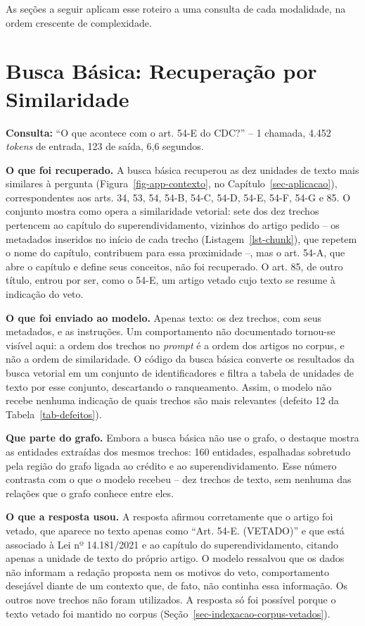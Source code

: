 As seções a seguir aplicam esse roteiro a uma consulta de cada modalidade, na ordem crescente de complexidade.

\section{Busca Básica: Recuperação por Similaridade}
\label{sec-analise-basic}

\textbf{Consulta:} ``O que acontece com o art. 54-E do CDC?'' -- 1 chamada, 4.452 \textit{tokens} de entrada, 123 de saída, 6,6 segundos.

\textbf{O que foi recuperado.} A busca básica recuperou as dez unidades de texto mais similares à pergunta (Figura~\ref{fig-app-contexto}, no Capítulo~\ref{sec-aplicacao}), correspondentes aos arts. 34, 53, 54, 54-B, 54-C, 54-D, 54-E, 54-F, 54-G e 85. O conjunto mostra como opera a similaridade vetorial: sete dos dez trechos pertencem ao capítulo do superendividamento, vizinhos do artigo pedido -- os metadados inseridos no início de cada trecho (Listagem~\ref{lst-chunk}), que repetem o nome do capítulo, contribuem para essa proximidade --, mas o art. 54-A, que abre o capítulo e define seus conceitos, não foi recuperado. O art. 85, de outro título, entrou por ser, como o 54-E, um artigo vetado cujo texto se resume à indicação do veto.

\textbf{O que foi enviado ao modelo.} Apenas texto: os dez trechos, com seus metadados, e as instruções. Um comportamento não documentado tornou-se visível aqui: a ordem dos trechos no \textit{prompt} é a ordem dos artigos no corpus, e não a ordem de similaridade. O código da busca básica converte os resultados da busca vetorial em um conjunto de identificadores e filtra a tabela de unidades de texto por esse conjunto, descartando o ranqueamento. Assim, o modelo não recebe nenhuma indicação de quais trechos são mais relevantes (defeito 12 da Tabela~\ref{tab-defeitos}).

\textbf{Que parte do grafo.} Embora a busca básica não use o grafo, o destaque mostra as entidades extraídas dos mesmos trechos: 160 entidades, espalhadas sobretudo pela região do grafo ligada ao crédito e ao superendividamento. Esse número contrasta com o que o modelo recebeu -- dez trechos de texto, sem nenhuma das relações que o grafo conhece entre eles.

\textbf{O que a resposta usou.} A resposta afirmou corretamente que o artigo foi vetado, que aparece no texto apenas como ``Art. 54-E. (VETADO)'' e que está associado à Lei nº 14.181/2021 e ao capítulo do superendividamento, citando apenas a unidade de texto do próprio artigo. O modelo ressalvou que os dados não informam a redação proposta nem os motivos do veto, comportamento desejável diante de um contexto que, de fato, não continha essa informação. Os outros nove trechos não foram utilizados. A resposta só foi possível porque o texto vetado foi mantido no corpus (Seção~\ref{sec-indexacao-corpus-vetados}).

